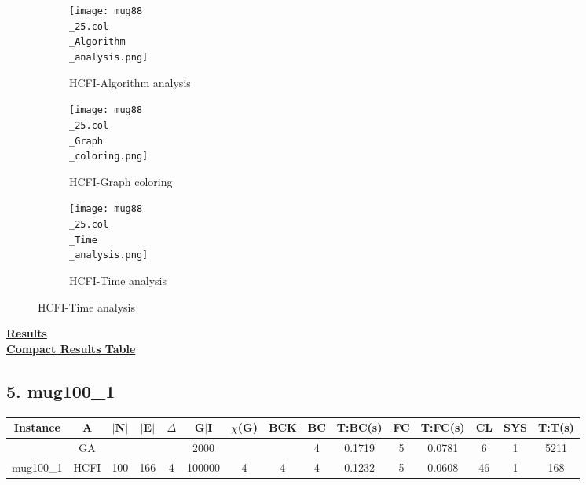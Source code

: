 \documentclass[10pt]{article}
\begin{document}
\graphicspath{{./Core1/Solutions/HCFI/mug88\_25.col}}
\begin{figure}[H]
\centering
\begin{subfigure}{.33\textwidth}
  \centering
  \texttt{[image: mug88\\\_25.col\\\_Algorithm\\\_analysis.png]}
  \caption{HCFI-Algorithm analysis}
   \label{fig:subfig1}
\end{subfigure}%
\begin{subfigure}{.33\textwidth}
  \centering
  \texttt{[image: mug88\\\_25.col\\\_Graph\\\_coloring.png]}
  \caption{HCFI-Graph coloring}
  \label{fig:subfig2}
\end{subfigure}
\begin{subfigure}{.33\textwidth}
  \centering
  \texttt{[image: mug88\\\_25.col\\\_Time\\\_analysis.png]}
  \caption{HCFI-Time analysis}
  \label{fig:subfig2}
\end{subfigure}
\end{figure}
\vspace{2cm}
\begin{center}
\hyperlink{page.8}{\textbf{Results}}\\
\vspace{0.5cm}
\hyperlink{page.71}{\textbf{Compact Results Table}}
\end{center}
\pagebreak
\subsection*{\hspace{0,9073976cm} 5. mug100\_1}
\begin{table}[H]
\centering
\begin{tabular}{|c|c|c|c|c|c|c|c|c|c|c|c|c|c|c|}
\hline
Instance& A &$|$N$|$ & $|$E$|$ & $\Delta$ & G$|$I & $\chi$(G) &BCK&BC & T:BC(s) & FC & T:FC(s) & CL & SYS & T:T(s) \\ \hline \hline
&GA&       &                   &                     &2000         &     \cellcolor{yellow} & {\cellcolor{yellow}}& {{\cellcolor{green}4}}
&0.1719   &5        & 0.0781                   & 6                   & 1         &5211         \\ \cline{2-2} \cline{6-6} \cline{9-15}
 \multirow{-2}{*}{mug100\_1} &HCFI   &\multirow{-2}{*}{100}   &\multirow{-2}{*}{166}     &\multirow{-2}{*}{4}     &100000     &\multirow{-2}{*}{\cellcolor{yellow}4}      & \multirow{-2}{*}{\cellcolor{yellow}4}    &{\cellcolor{green}4}     &0.1232         &5    &0.0608         &46    &1     &168        \\ \hline 
\end{tabular}
\end{table}
\end{document}
